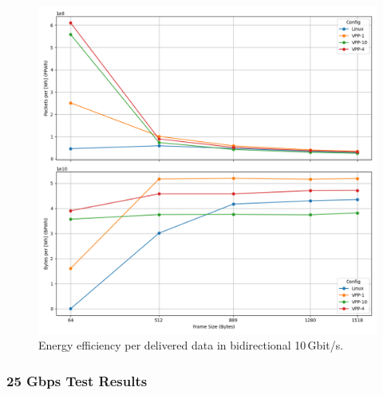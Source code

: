 \begin{figure}[!htbp]
    \centering
    \includegraphics[width=\linewidth]{images/consumption-bi-10g.png}
    \caption{Energy efficiency per delivered data in bidirectional 10\,Gbit/s.}
    \label{fig:bi-10g}
\end{figure}

\subsubsection{25 Gbps Test Results}

